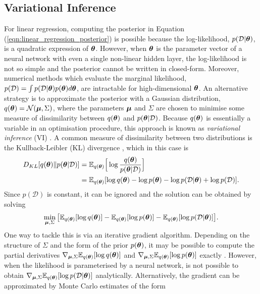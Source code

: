 \documentclass[10pt]{article} %
\begin{document}
\subsection{Variational Inference}\label{sec:vi}
For linear regression, computing the posterior in Equation (\ref{eqn:linear_regression_posterior}) is possible because the log-likelihood, $p(\mathcal{D} | {\bm{\theta}})$, is a quadratic expression of ${\bm{\theta}}$. However, when ${\bm{\theta}}$ is the parameter vector of a neural network with even a single non-linear hidden layer, the log-likelihood is not so simple and the posterior cannot be written in closed-form. Moreover, numerical methods which evaluate the marginal likelihood, $p(\mathcal{D}) = \int p(\mathcal{D} | {\bm{\theta}}) p({\bm{\theta}}) d{\bm{\theta}}$, are intractable for high-dimensional ${\bm{\theta}}$. An alternative strategy is to approximate the posterior with a Gaussian distribution, $q({\bm{\theta}}) = \mathcal{N}({\bm{\mu}}, \Sigma)$, where the parameters ${\bm{\mu}}$ and $\Sigma$ are chosen to minimise some measure of dissimilarity between $q({\bm{\theta}})$ and $p({\bm{\theta}} | \mathcal{D})$. Because $q({\bm{\theta}})$ is essentially a variable in an optimisation procedure, this approach is known as \emph{variational inference} (VI) \citep{barber2007}. A common measure of dissimilarity between two distributions is the Kullback-Leibler (KL) divergence \cite{barber2007}, which in this case is
\begin{align}
\begin{split}
	D_{KL}[q({\bm{\theta}}) \Vert p({\bm{\theta}} | \mathcal{D})] 
	& = \mathbb{E}_{q({\bm{\theta}})} \Big[\log \frac{q({\bm{\theta}})}{p({\bm{\theta}} | \mathcal{D})}\Big] \\
	& = \mathbb{E}_{q({\bm{\theta}})} [\log q({\bm{\theta}}) - \log p({\bm{\theta}}) - \log p(\mathcal{D} | {\bm{\theta}}) + \log p(\mathcal{D})].
\end{split}
\end{align}
Since $p(\mathcal{D})$ is constant, it can be ignored and the solution can be obtained by solving 
\begin{equation}\label{eqn:vi_objective}
	\min_{{\bm{\mu}}, \Sigma} \big[ \mathbb{E}_{q({\bm{\theta}})} [\log q({\bm{\theta}})] - \mathbb{E}_{q({\bm{\theta}})} [\log p({\bm{\theta}}) ] - \mathbb{E}_{q({\bm{\theta}})} [\log p(\mathcal{D} | {\bm{\theta}})] \big].
\end{equation}
One way to tackle this is via an iterative gradient algorithm. Depending on the structure of $\Sigma$ and the form of the prior $p({\bm{\theta}})$, it may be possible to compute the partial derivatives $\nabla_{{\bm{\mu}}, \Sigma} \mathbb{E}_{q({\bm{\theta}})} [\log q({\bm{\theta}})]$ and $\nabla_{{\bm{\mu}}, \Sigma} \mathbb{E}_{q({\bm{\theta}})} [\log p({\bm{\theta}}) ]$ exactly \citep{kingma2013}. However, when the likelihood is parameterised by a neural network, is not possible to obtain $ \nabla_{{\bm{\mu}}, \Sigma}\mathbb{E}_{q({\bm{\theta}})} [\log p(\mathcal{D} | {\bm{\theta}})]$ analytically. Alternatively, the gradient can be approximated by Monte Carlo estimates of the form 
\end{document}
